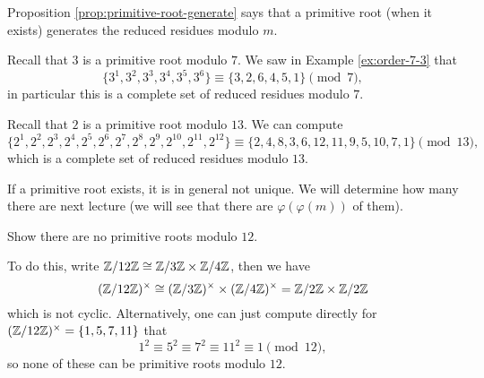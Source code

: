 \begin{remark}
  Proposition \ref{prop:primitive-root-generate}
  says that a primitive root (when it exists)
  generates the reduced residues modulo
  $m$.
\end{remark}

\begin{example}
  Recall that $3$ is a primitive root
  modulo $7$. We saw in Example
  \ref{ex:order-7-3} that
  \[
    \{3^1, 3^2, 3^3, 3^4, 3^5, 3^6\}
    \equiv \{3, 2, 6, 4, 5, 1\}
    \pmod{7},
  \]
  in particular this is a complete set of
  reduced residues modulo $7$.
\end{example}

\begin{example}
  Recall that $2$ is a primitive root
  modulo $13$. We can compute
  \[
    \{2^1, 2^2, 2^3, 2^4, 2^5, 2^6,
    2^7, 2^8, 2^9, 2^{10}, 2^{11}, 2^{12}\}
    \equiv
    \{2, 4, 8, 3, 6, 12, 11, 9, 5, 10, 7, 1\}
    \pmod{13},
  \]
  which is a complete set of reduced residues
  modulo $13$.
\end{example}

\begin{remark}
  If a primitive root exists, it is
  in general not unique. We will determine
  how many there are next lecture
  (we will see that there are
  $\varphi(\varphi(m))$ of them).
\end{remark}

\begin{exercise}
  Show there are no primitive roots
  modulo $12$.

  To do this, write
  $\mathbb{Z} / 12\mathbb{Z} \cong \mathbb{Z} / 3\mathbb{Z} \times \mathbb{Z} / 4\mathbb{Z}$,
  then we have
  \[(\mathbb{Z} / 12\mathbb{Z})^\times \cong (\mathbb{Z} / 3\mathbb{Z})^\times \times (\mathbb{Z} / 4\mathbb{Z})^\times = \mathbb{Z} / 2\mathbb{Z} \times \mathbb{Z} / 2\mathbb{Z}\]
  which is not cyclic.
  Alternatively, one can just compute
  directly
  for $(\mathbb{Z} / 12\mathbb{Z})^\times = \{1, 5, 7, 11\}$
  that
  \[
    1^2 \equiv 5^2 \equiv 7^2 \equiv 11^2 \equiv 1 \pmod{12},
  \]
  so none of these can be primitive
  roots modulo $12$.
\end{exercise}
